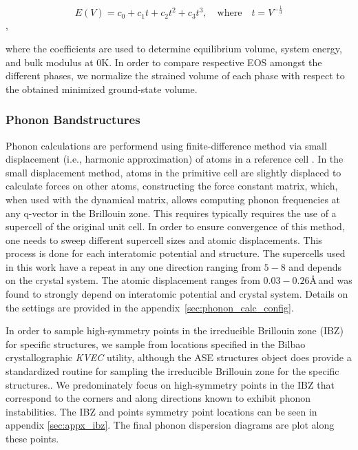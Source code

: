 \documentclass[preprint]{elsarticle}
\begin{document}
\begin{equation}
  \label{eq:eos_fit}
  E(V) = c_0 + c_1 t + c_2 t^2 + c_3 t^3, \quad \text{where} \quad t = V^{-\frac{1}{3}}
\end{equation},

where the coefficients are used to determine equilibrium volume, system energy, and bulk modulus \cite{Alchagirov2003} at 0K. In order to compare respective EOS amongst the different phases, we normalize the strained volume of each phase with respect to the obtained minimized ground-state volume. \par

\subsubsection{Phonon Bandstructures}
Phonon calculations are performend using finite-difference method via small displacement (i.e., harmonic approximation) of atoms in a reference cell \cite{Alfe2009}. In the small displacement method, atoms in the primitive cell are slightly displaced to calculate forces on other atoms, constructing the force constant matrix, which, when used with the dynamical matrix, allows computing phonon frequencies at any q-vector in the Brillouin zone. This requires typically requires the use of a supercell of the original unit cell. In order to ensure convergence of this method, one needs to sweep different supercell sizes and atomic displacements. This process is done for each interatomic potential and structure. The supercells used in this work  have a repeat in any one direction ranging from $5-8$ and depends on the crystal system. The atomic displacement ranges from $0.03-0.26$\AA\,and was found to strongly depend on interatomic potential and crystal system. Details on the settings are provided in the appendix~\ref{sec:phonon_calc_config}. \par

In order to sample high-symmetry points in the irreducible Brillouin zone (IBZ) for specific structures, we sample from locations specified in the Bilbao crystallographic \textit{KVEC} utility\cite{Aroyo2014}, although the ASE structures object does provide a standardized routine for sampling the irreducible Brillouin zone for the specific structures.\cite{Setyawan2010}. We predominately focus on high-symmetry points in the IBZ that correspond to the corners and along directions known to exhibit phonon instabilities. The IBZ and points symmetry point locations can be seen in appendix \ref{sec:appx_ibz}. The final phonon dispersion diagrams are plot along these points. \par
\end{document}
